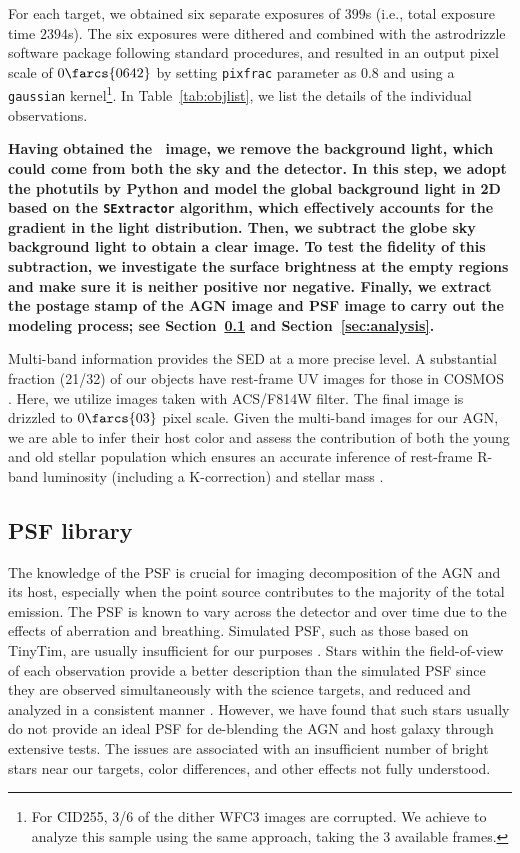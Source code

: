 \documentclass[apj]{emulateapj}
\begin{document}
For each target, we obtained six separate exposures of $399$s (i.e., total exposure time $2394$s). The six exposures were dithered and combined with the {\sc astrodrizzle} software package following standard procedures, and resulted in an output pixel scale of $0\farcs{0642}$ by setting \texttt{pixfrac} parameter as $0.8$ and using a \texttt{gaussian} kernel\footnote{\label{note1}For CID255, 3/6 of the dither WFC3 images are corrupted. We achieve to analyze this sample using the same approach, taking the 3 available frames.}. In Table~\ref{tab:objlist}, we list the details of the individual observations.

{\bf Having obtained the \hst\ image, we remove the background light, which could come from both the sky and the detector. In this step, we adopt the {\sc photutils} by Python and model the global background light in 2D based on the \texttt{SExtractor} algorithm, which effectively accounts for the gradient in the light distribution. Then, we subtract the globe sky background light to obtain a clear image. To test the fidelity of this subtraction, we investigate the surface brightness at the empty regions and make sure it is neither positive nor negative. Finally, we extract the postage stamp of the AGN image and PSF image to carry out the modeling process; see Section~\ref{sec:psf_library} and Section~\ref{sec:analysis}.} 

Multi-band information provides the SED at a more precise level. A substantial fraction (21/32) of our objects have rest-frame UV images for those in COSMOS \citep{Koekemoer2007}. Here, we utilize images taken with ACS/F814W filter. The final image is drizzled to $0\farcs{03}$ pixel scale. Given the multi-band images for our AGN, we are able to infer their host color and assess the contribution of both the young and old stellar population which ensures an accurate inference of rest-frame R-band luminosity (including a K-correction) and stellar mass \citep{Gallazzi2009}. 

\subsection{PSF library}
\label{sec:psf_library}

The knowledge of the PSF is crucial for imaging decomposition of the AGN and its host, especially when the point source contributes to the majority of the total emission. The PSF is known to vary across the detector and over time due to the effects of aberration and breathing. Simulated PSF, such as those based on {\sc TinyTim}, are usually insufficient for our purposes \citep{Mechtley2012}. Stars within the field-of-view of each observation provide a better description than the simulated PSF since they are observed simultaneously with the science targets, and reduced and analyzed in a consistent manner \citet{Kim2008, Park15}. However, we have found that such stars usually do not provide an ideal PSF for de-blending the AGN and host galaxy through extensive tests. The issues are associated with an insufficient number of bright stars near our targets, color differences, and other effects not fully understood.
\end{document}
